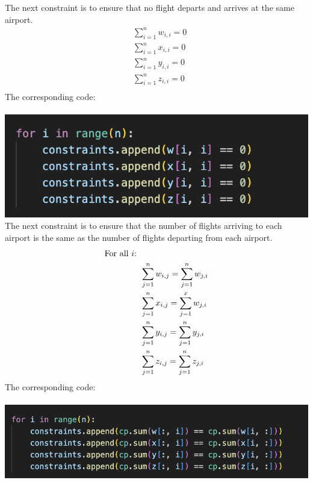 \documentclass[12pt]{extarticle}
\begin{document}
The next constraint is to ensure that no flight departs and arrives at the same airport.
\begin{align*}
&\sum_{i=1}^nw_{i,i} = 0 \\
&\sum_{i=1}^nx_{i,i} = 0 \\
&\sum_{i=1}^ny_{i,i} = 0 \\
&\sum_{i=1}^nz_{i,i} = 0 \\
\end{align*}
The corresponding code: \\ \\
\includegraphics[scale = .5]{images/constraints2.png} \\

The next constraint is to ensure that the number of flights arriving to each airport is the same as the number of flights departing from each airport.
\begin{align*}
&\text{For all } i \text{:} \\
&\hspace{1.5cm}\sum_{j=1}^nw_{i,j} = \sum_{j=1}^nw_{j,i} \\
&\hspace{1.5cm}\sum_{j=1}^nx_{i,j} = \sum_{j=1}^xw_{j,i} \\
&\hspace{1.5cm}\sum_{j=1}^ny_{i,j} = \sum_{j=1}^ny_{j,i} \\
&\hspace{1.5cm}\sum_{j=1}^nz_{i,j} = \sum_{j=1}^nz_{j,i} \\
\end{align*}
The corresponding code: \\ \\
\includegraphics[scale = .5]{images/constraints3.png} \\
\end{document}
